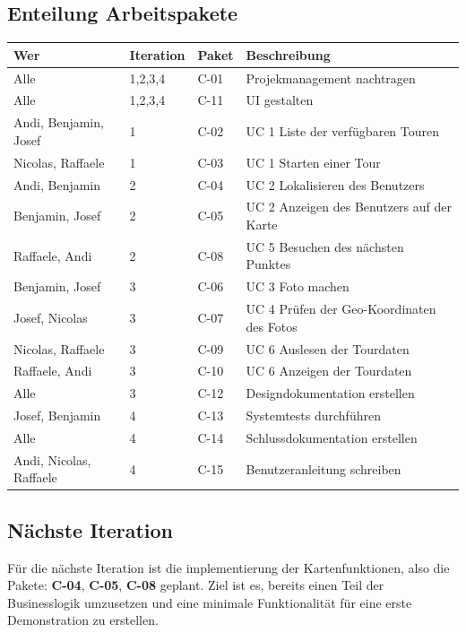 \documentclass[a4paper,10pt,xetex]{article}
\begin{document}
\subsection{Enteilung Arbeitspakete}\label{enteilung-arbeitspakete}
\begin{longtabu} to \textwidth { | l | l | l | X[l] | }
\hline
\textbf{Wer} & \textbf{Iteration} & \textbf{Paket} & \textbf{Beschreibung} \\\hline
\endhead

Alle                         & 1,2,3,4 & C-01 & Projekmanagement nachtragen \\\hline
Alle                         & 1,2,3,4 & C-11 & UI gestalten \\\hline
Andi, Benjamin, Josef        & 1       & C-02 & UC 1 Liste der verfügbaren Touren \\\hline
Nicolas, Raffaele            & 1       & C-03 & UC 1 Starten einer Tour \\\hline
Andi, Benjamin               & 2       & C-04 & UC 2 Lokalisieren des Benutzers \\\hline
Benjamin, Josef              & 2       & C-05 & UC 2 Anzeigen des Benutzers auf der Karte \\\hline
Raffaele, Andi               & 2       & C-08 & UC 5 Besuchen des nächsten Punktes \\\hline
Benjamin, Josef              & 3       & C-06 & UC 3 Foto machen \\\hline
Josef, Nicolas               & 3       & C-07 & UC 4 Prüfen der Geo-Koordinaten des Fotos \\\hline
Nicolas, Raffaele            & 3       & C-09 & UC 6 Auslesen der Tourdaten \\\hline
Raffaele, Andi               & 3       & C-10 & UC 6 Anzeigen der Tourdaten \\\hline
Alle                         & 3       & C-12 & Designdokumentation erstellen \\\hline
Josef, Benjamin              & 4       & C-13 & Systemtests durchführen \\\hline
Alle                         & 4       & C-14 & Schlussdokumentation erstellen \\\hline
Andi, Nicolas, Raffaele      & 4       & C-15 & Benutzeranleitung schreiben \\\hline
\end{longtabu}


\subsection{Nächste Iteration}\label{naechste-iteration}
Für die nächste Iteration ist die implementierung der Kartenfunktionen, also die Pakete: \textbf{C-04}, \textbf{C-05}, \textbf{C-08} geplant.
Ziel ist es, bereits einen Teil der Businesslogik umzusetzen und eine minimale Funktionalität für eine erste Demonstration zu erstellen.
\end{document}
